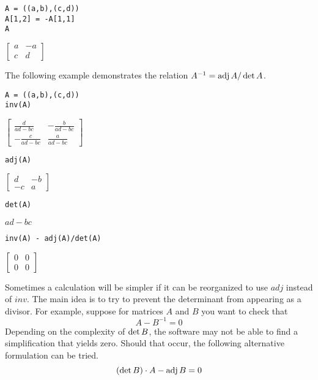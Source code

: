 \begin{Verbatim}[formatcom=\color{blue},samepage=true]
A = ((a,b),(c,d))
A[1,2] = -A[1,1]
A
\end{Verbatim}

$\displaystyle \begin{bmatrix}a&-a\\c&d\end{bmatrix}$

The following example demonstrates the relation
$A^{-1}=\mathop{\rm adj}{A}/\mathop{\rm det}{A}$.

\begin{Verbatim}[formatcom=\color{blue},samepage=true]
A = ((a,b),(c,d))
inv(A)
\end{Verbatim}

$\displaystyle \begin{bmatrix}\frac{d}{ad-bc} & -\frac{b}{ad-bc}\\-\frac{c}{ad-bc} & \frac{a}{ad-bc}\end{bmatrix}$

\begin{Verbatim}[formatcom=\color{blue},samepage=true]
adj(A)
\end{Verbatim}

$\displaystyle \begin{bmatrix}d & -b\\-c & a\end{bmatrix}$

\begin{Verbatim}[formatcom=\color{blue},samepage=true]
det(A)
\end{Verbatim}

$\displaystyle ad-bc$

\begin{Verbatim}[formatcom=\color{blue},samepage=true]
inv(A) - adj(A)/det(A)
\end{Verbatim}

$\displaystyle \begin{bmatrix}0 & 0\\0 & 0\end{bmatrix}$

Sometimes a calculation will be simpler if it can be reorganized to use
$adj$ instead of $inv$.
The main idea is to try to prevent the determinant from appearing as a
divisor.
For example, suppose for matrices $A$ and $B$ you want to check that
$${A}-{B}^{-1}=0$$
Depending on the complexity of $\mathop{\rm det}B$, the software
may not be able to find a simplification that yields zero.
Should that occur, the following alternative formulation can be tried.
$$(\mathop{\rm det}{B})\cdot{A}-\mathop{\rm adj}{B}=0$$

